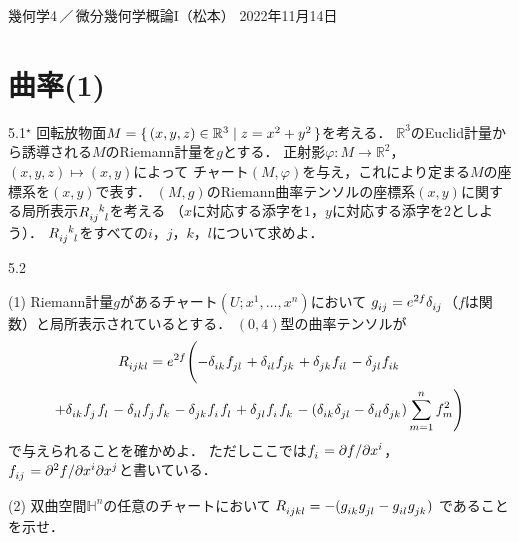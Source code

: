 \documentclass[uplatex,dvipdfmx,fontsize=12pt,jafontsize=11pt,line_length=42zw,number_of_lines=36,hanging_punctuation]{jlreq}
\begin{document}
\begin{flushleft}
	幾何学4\,／\,微分幾何学概論I（松本）
	\hfill
	2022年11月14日
\end{flushleft}
\setcounter{section}{4}
\section{曲率(1)}

\begin{problems}
	\item[5.1$^\star$]
		回転放物面$M=\set{(x,y,z)\in\mathbb{R}^3|z=x^2+y^2}$を考える．
		$\mathbb{R}^3$のEuclid計量から誘導される$M$のRiemann計量を$g$とする．
		正射影$\varphi\colon M\to\mathbb{R}^2$，$(x,y,z)\mapsto(x,y)$によって
		チャート$(M,\varphi)$を与え，これにより定まる$M$の座標系を$(x,y)$で表す．
		$(M,g)$のRiemann曲率テンソルの座標系$(x,y)$に関する局所表示$\tensor{R}{_i_j^k_l}$を考える
		（$x$に対応する添字を$1$，$y$に対応する添字を$2$としよう）．
		$\tensor{R}{_i_j^k_l}$をすべての$i$，$j$，$k$，$l$について求めよ．
	\item[5.2]\phantom{}
		\begin{subproblems}
			\item[(1)]\vspace{-\baselineskip}
				Riemann計量$g$があるチャート$(U;x^1,\dots,x^n)$において
				$\tensor{g}{_i_j}=e^{2f}\tensor{\delta}{_i_j}$（$f$は関数）と局所表示されているとする．
				$(0,4)$型の曲率テンソルが
				\begin{multline}
						\tensor{R}{_i_j_k_l}
						=e^{2f}\Bigg(
						{-\tensor{\delta}{_i_k}\tensor{f}{_j_l}}
						+\tensor{\delta}{_i_l}\tensor{f}{_j_k}
						+\tensor{\delta}{_j_k}\tensor{f}{_i_l}
						-\tensor{\delta}{_j_l}\tensor{f}{_i_k}\\
						+\tensor{\delta}{_i_k}\tensor{f}{_j}\tensor{f}{_l}
						-\tensor{\delta}{_i_l}\tensor{f}{_j}\tensor{f}{_k}
						-\tensor{\delta}{_j_k}\tensor{f}{_i}\tensor{f}{_l}
						+\tensor{\delta}{_j_l}\tensor{f}{_i}\tensor{f}{_k}
						-(\tensor{\delta}{_i_k}\tensor{\delta}{_j_l}
						-\tensor{\delta}{_i_l}\tensor{\delta}{_j_k})\sum_{m=1}^nf_m^2\Bigg)
				\end{multline}
				で与えられることを確かめよ．
				ただしここでは$\tensor{f}{_i}=\partial f/\partial x^i$，
				$\tensor{f}{_i_j}=\partial^2f/\partial x^i\partial x^j$と書いている．
			\item[(2)]
				双曲空間$\mathbb{H}^n$の任意のチャートにおいて
				$\tensor{R}{_i_j_k_l}=-(\tensor{g}{_i_k}\tensor{g}{_j_l}-\tensor{g}{_i_l}\tensor{g}{_j_k})$
				であることを示せ．

\end{subproblems}
\end{problems}
\end{document}
